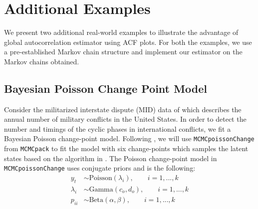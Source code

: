 \documentclass[11pt]{article}
\theoremstyle{remark}
\begin{document}
\section{Additional Examples}
We present two additional real-world examples to illustrate the advantage of global autocorrelation estimator using ACF plots. For both the examples, we use a pre-established Markov chain structure and implement our estimator on the Markov chains obtained.
\subsection{Bayesian Poisson Change Point Model}


Consider the militarized interstate dispute (MID) data of \cite{martin2011mcmcpack} which describes the annual number of military conflicts in the United States. In order to detect the number and timings of the cyclic phases in international conflicts, we fit a Bayesian Poisson change-point model. Following \cite{martin2011mcmcpack}, we will use \texttt{MCMCpoissonChange} from \texttt{MCMCpack} to fit the model with six change-points which samples the latent states based on the algorithm in \cite{chib1998estimation}. The Poisson change-point model in \texttt{MCMCpoissonChange} uses conjugate priors and is the following:
%
\begin{align*}
    y_t &\sim \text{Poisson}(\lambda_i), \qquad i = 1, ..., k\\
    \lambda_i &\sim \text{Gamma}(c_o, d_o), \qquad i = 1,..., k\\
    p_{ii} &\sim \text{Beta}(\alpha, \beta), \qquad i = 1,..., k
\end{align*}
\end{document}
